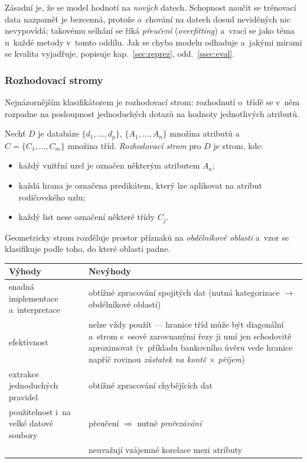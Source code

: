 \documentclass[11pt,a4paper]{article}
\theoremstyle{definition}
\begin{document}
Zásadní je, že se model hodnotí na \emph{nových} datech. Schopnost naučit se trénovací data
nazpaměť je bezcenná, protože o~chování na datech dosud neviděných nic nevypovídá; takovému
selhání se říká \emph{přeučení} (\emph{overfitting}) a~vrací se jako téma u~každé metody
v~tomto oddílu. Jak se chyba modelu odhaduje a~jakými mírami se kvalita vyjadřuje, popisuje
kap.~\ref{sec:reprez}, odd.~\ref{ssec:eval}.

\subsubsection{Rozhodovací stromy}

Nejnázornějším klasifikátorem je rozhodovací strom: rozhodnutí o~třídě se v~něm rozpadne na
posloupnost jednoduchých dotazů na hodnoty jednotlivých atributů.

\begin{defbox}
Nechť $D$ je databáze $\{d_1,\dots,d_p\}$, $\{A_1,\dots,A_n\}$ množina atributů
a~$C=\{C_1,\dots,C_m\}$ množina tříd. \emph{Rozhodovací strom} pro $D$ je strom, kde:
\begin{itemize}
\item každý vnitřní uzel je označen některým atributem $A_a$;
\item každá hrana je označena predikátem, který lze aplikovat na atribut rodičovského uzlu;
\item každý list nese označení některé třídy $C_j$.
\end{itemize}
Geometricky strom rozděluje prostor příznaků na \emph{obdélníkové oblasti} a~vzor se
klasifikuje podle toho, do které oblasti padne.
\end{defbox}

\begin{center}
\small
\begin{tabular}{@{}p{7.4cm}p{8.2cm}@{}}
\toprule
\textbf{Výhody} & \textbf{Nevýhody} \\
\midrule
snadná implementace a~interpretace & obtížné zpracování spojitých dat (nutná kategorizace
  $\to$ obdélníkové oblasti) \\
efektivnost & nelze vždy použít --- hranice tříd může být diagonální a~strom s~osově
  zarovnanými řezy ji umí jen schodovitě aproximovat (v~příkladu bankovního úvěru vede
  hranice napříč rovinou \emph{zůstatek na kontě} $\times$ \emph{příjem}) \\
extrakce jednoduchých pravidel & obtížné zpracování chybějících dat \\
použitelnost i~na velké datové soubory & přeučení $\Rightarrow$ nutné \emph{prořezávání} \\
  & neuvažují vzájemné korelace mezi atributy \\
\bottomrule
\end{tabular}
\end{center}
\end{document}
